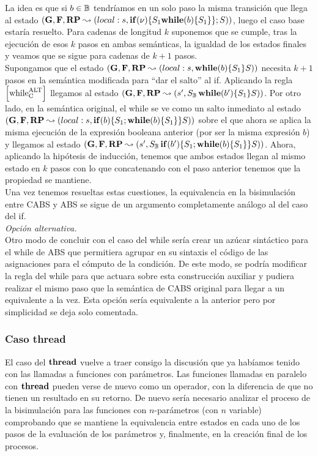 La idea es que si $b \in \mathbb{B}$ tendríamos en un solo paso la misma transición que llega al estado $(\mathbf{G}, \mathbf{F}, \textbf{RP} \leadsto (local:s, \mbox{\textbf{if}} (\nu) \{S_1\mbox{\textbf{while}} (b) \{S_1\}\}\mbox{;\,}S))$, luego el caso base estaría resuelto. Para cadenas de longitud $k$ suponemos que se cumple, tras la ejecución de esos $k$ pasos en ambas semánticas, la igualdad de los estados finales y veamos que se sigue para cadenas de $k+1$ pasos.\\

Supongamos que el estado $(\mathbf{G}, \mathbf{F}, \textbf{RP} \leadsto (local:s, \mbox{\textbf{while}} (b) \{S_1\}S))$ necesita $k+1$ pasos en la semántica modificada para ``dar el salto'' al if. Aplicando la regla $\left[ \text{while}_{\text{C}}^{\text{ALT}} \right]$ llegamos al estado $(\mathbf{G}, \mathbf{F}, \textbf{RP} \leadsto (s', S_{\mathbb{B}}\,\mbox{\textbf{while}} (b') \{S_1\}S))$. Por otro lado, en la semántica original, el while se ve como un salto inmediato al estado $(\mathbf{G}, \mathbf{F}, \textbf{RP} \leadsto (local:s, \mbox{\textbf{if}} (b) \{S_1\mbox{;\,}\mbox{\textbf{while}} (b) \{S_1\}\}S))$ sobre el que ahora se aplica la misma ejecución de la expresión booleana anterior (por ser la misma expresión $b$) y llegamos al estado $(\mathbf{G}, \mathbf{F}, \textbf{RP} \leadsto (s', S_{\mathbb{B}}\,\mbox{\textbf{if}} (b') \{S_1\mbox{;\,}\mbox{\textbf{while}} (b) \{S_1\}\}S))$. Ahora, aplicando la hipótesis de inducción, tenemos que ambos estados llegan al mismo estado en $k$ pasos con lo que concatenando con el paso anterior tenemos que la propiedad se mantiene.\\

Una vez tenemos resueltas estas cuestiones, la equivalencia en la bisimulación entre CABS y ABS se sigue de un argumento completamente análogo al del caso del if.\\

\textit{Opción alternativa.}\\

Otro modo de concluir con el caso del while sería crear un azúcar sintáctico para el while de ABS que permitiera agrupar en su sintaxis el código de las asignaciones para el cómputo de la condición. De este modo, se podría modificar la regla del while para que actuara sobre esta construcción auxiliar y pudiera realizar el mismo paso que la semántica de CABS original para llegar a un equivalente a la vez. Esta opción sería equivalente a la anterior pero por simplicidad se deja solo comentada.

\subsubsection{Caso thread}

El caso del $\textbf{thread}$ vuelve a traer consigo la discusión que ya habíamos tenido con las llamadas a funciones con parámetros. Las funciones llamadas en paralelo con $\textbf{thread}$ pueden verse de nuevo como un operador, con la diferencia de que no tienen un resultado en su retorno. De nuevo sería necesario analizar el proceso de la bisimulación para las funciones con $n$-parámetros (con $n$ variable) comprobando que se mantiene la equivalencia entre estados en cada uno de los pasos de la evaluación de los parámetros y, finalmente, en la creación final de los procesos.\\

